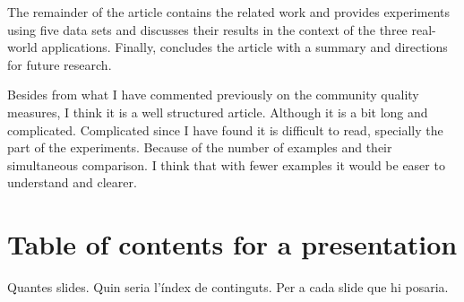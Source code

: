 \documentclass[a4paper]{article}
\begin{document}
The remainder of the article contains the related work and provides experiments using five data sets and discusses their results in the context of the three real-world applications. Finally, concludes the article with a summary and directions for future research.
\vskip 0.3cm

Besides from what I have commented previously on the community quality measures, I think it is a well structured article. Although it is a bit long and complicated. Complicated since I have found it is difficult to read, specially the part of the experiments. Because of the number of examples and their simultaneous comparison. I think that with fewer examples it would be easer to understand and clearer.

\section*{Table of contents for a presentation}
Quantes slides. Quin seria l'índex de continguts.
Per a cada slide que hi posaria.
\end{document}
